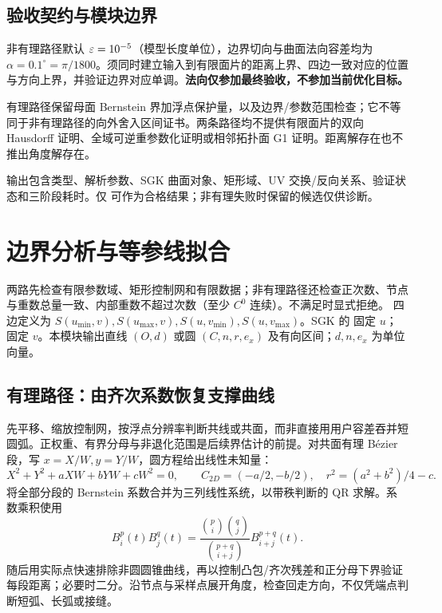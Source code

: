 \subsection{验收契约与模块边界}
非有理路径默认 $\varepsilon=10^{-5}$（模型长度单位），边界切向与曲面法向容差均为 $\alpha=0.1^\circ=\pi/1800$。须同时建立输入到有限面片的距离上界、四边一致对应的位置与方向上界，并验证边界对应单调。\textbf{法向仅参加最终验收，不参加当前优化目标。}

有理路径保留母面 Bernstein 界加浮点保护量，以及边界/参数范围检查；它不等同于非有理路径的向外舍入区间证书。两条路径均不提供有限面片的双向 Hausdorff 证明、全域可逆重参数化证明或相邻拓扑面 G1 证明。距离解存在也不推出角度解存在。

输出包含类型、解析参数、SGK 曲面对象、矩形域、UV 交换/反向关系、验证状态和三阶段耗时。仅  可作为合格结果；非有理失败时保留的候选仅供诊断。

\clearpage
\section{边界分析与等参线拟合}
两路先检查有限参数域、矩形控制网和有限数据；非有理路径还检查正次数、节点与重数总量一致、内部重数不超过次数（至少 $C^0$ 连续）。不满足时显式拒绝。
四边定义为 $S(u_{\min},v),S(u_{\max},v),S(u,v_{\min}),S(u,v_{\max})$。SGK 的  固定 $u$； 固定 $v$。本模块输出直线 $(O,d)$ 或圆 $(C,n,r,e_x)$ 及有向区间；$d,n,e_x$ 为单位向量。

\subsection{有理路径：由齐次系数恢复支撑曲线}
先平移、缩放控制网，按浮点分辨率判断共线或共面，而非直接用用户容差吞并短圆弧。正权重、有界分母与非退化范围是后续界估计的前提。对共面有理 Bézier 段，写 $x=X/W,y=Y/W$，圆方程给出线性未知量：
\begin{equation}
 X^2+Y^2+aXW+bYW+cW^2=0,\qquad
 C_{2D}=(-a/2,-b/2),\quad r^2=(a^2+b^2)/4-c.
\end{equation}
将全部分段的 Bernstein 系数合并为三列线性系统，以带秩判断的 QR 求解。系数乘积使用
\begin{equation}
 B_i^p(t)B_j^q(t)=\frac{\binom pi\binom qj}{\binom{p+q}{i+j}}B_{i+j}^{p+q}(t).
\end{equation}
随后用实际点快速排除非圆圆锥曲线，再以控制凸包/齐次残差和正分母下界验证每段距离；必要时二分。沿节点与采样点展开角度，检查回走方向，不仅凭端点判断短弧、长弧或接缝。


